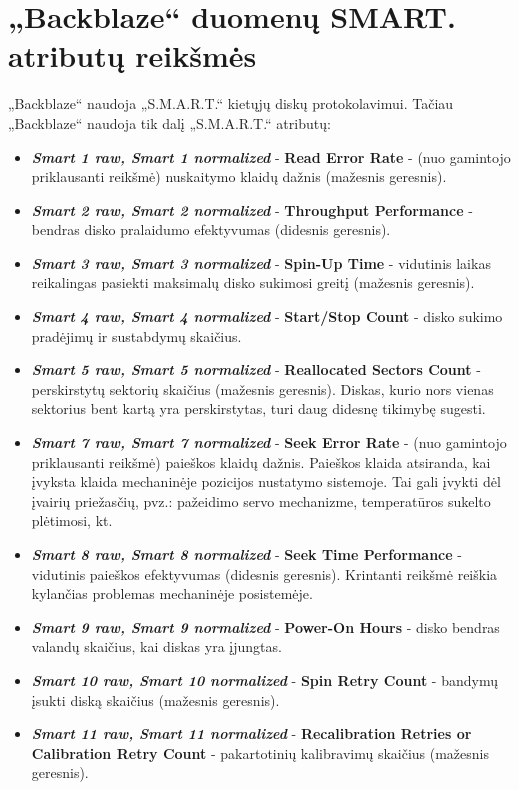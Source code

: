 \documentclass{VUMIFPSkursinis}
\begin{document}
\section{„Backblaze“ duomenų SMART. atributų reikšmės} \label{sec:smart}
„Backblaze“ naudoja „S.M.A.R.T.“ kietųjų diskų protokolavimui. Tačiau „Backblaze“ naudoja tik dalį „S.M.A.R.T.“ atributų:
\begin{itemize}
\item \textit{\textbf{Smart 1 raw, Smart 1 normalized}} - \textbf{Read Error Rate} - (nuo gamintojo priklausanti reikšmė) nuskaitymo klaidų dažnis (mažesnis geresnis).
\item \textit{\textbf{Smart 2 raw, Smart 2 normalized}} - \textbf{Throughput Performance} - bendras disko pralaidumo efektyvumas (didesnis geresnis).
\item \textit{\textbf{Smart 3 raw, Smart 3 normalized}} - \textbf{Spin-Up Time} - vidutinis laikas reikalingas pasiekti maksimalų disko sukimosi greitį (mažesnis geresnis).
\item \textit{\textbf{Smart 4 raw, Smart 4 normalized}} - \textbf{Start/Stop Count} - disko sukimo pradėjimų ir sustabdymų skaičius.
\item \textit{\textbf{Smart 5 raw, Smart 5 normalized}} - \textbf{Reallocated Sectors Count} - perskirstytų sektorių skaičius (mažesnis geresnis). Diskas, kurio nors vienas sektorius bent kartą yra perskirstytas, turi daug didesnę tikimybę sugesti.
\item \textit{\textbf{Smart 7 raw, Smart 7 normalized}} - \textbf{Seek Error Rate} - (nuo gamintojo priklausanti reikšmė) paieškos klaidų dažnis. Paieškos klaida atsiranda, kai įvyksta klaida mechaninėje pozicijos nustatymo sistemoje. Tai gali įvykti dėl įvairių priežasčių, pvz.: pažeidimo servo mechanizme, temperatūros sukelto plėtimosi, kt.
\item \textit{\textbf{Smart 8 raw, Smart 8 normalized}} - \textbf{Seek Time Performance} - vidutinis paieškos efektyvumas (didesnis geresnis). Krintanti reikšmė reiškia kylančias problemas mechaninėje posistemėje.
\item \textit{\textbf{Smart 9 raw, Smart 9 normalized}} - \textbf{Power-On Hours} - disko bendras valandų skaičius, kai diskas yra įjungtas.
\item \textit{\textbf{Smart 10 raw, Smart 10 normalized}} - \textbf{Spin Retry Count} - bandymų įsukti diską skaičius (mažesnis geresnis).
\item \textit{\textbf{Smart 11 raw, Smart 11 normalized}} - \textbf{Recalibration Retries or Calibration Retry Count} - pakartotinių kalibravimų skaičius (mažesnis geresnis).

\end{itemize}
\end{document}
